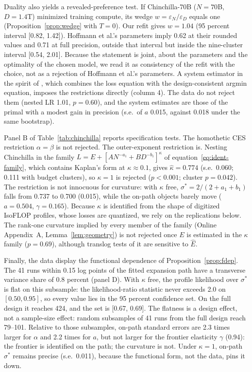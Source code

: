 Duality also yields a revealed-preference test. If Chinchilla-70B ($N=70$B, $D=1.4$T) minimized training compute,
its wedge $w=\varepsilon_N/\varepsilon_D$ equals one (Proposition~\ref{prop:wedge} with $T=0$). Our refit gives
$w=1.04$ (95 percent interval [0.82, 1.42]). Hoffmann et al.'s parameters imply 0.62 at their rounded values and 0.71
at full precision, outside that interval but inside the nine-cluster interval [0.54, 2.01]. Because the statement is joint,
about the parameters and the optimality of the chosen model, we read it as consistency of the refit with the choice,
not as a rejection of Hoffmann et al.'s parameters. A system estimator in the spirit of
\citet{leonledesma2010identifying}, which combines the loss equation with the design-consistent argmin equation,
imposes the restrictions directly (column 4). The data do not reject them (nested LR 1.01, $p=0.60$), and the system
estimates are those of the primal with a modest gain in precision (s.e.\ of $a$ 0.015, against 0.018 under the same
bootstrap).

Panel B of Table~\ref{tab:chinchilla} reports specification tests. The homothetic CES restriction $\alpha=\beta$ is not rejected. The outer-exponent
restriction is. Nesting Chinchilla in the family $L=E+[AN^{-a_1}+BD^{-b_1}]^{\kappa}$ of
equation~\eqref{eq:ident-family}, which contains Kaplan's form at $\kappa\approx0.1$, gives $\hat\kappa=0.774$ (s.e.\
0.060; 0.111 with budget clusters), so $\kappa=1$ is rejected ($p<0.001$; cluster $p=0.042$). The restriction is not
innocuous for curvature: with $\kappa$ free, $\sigma^*=2/(2+a_1+b_1)$ falls from 0.737 to 0.700 (0.015), while the
on-path objects barely move ($a=0.504$, $\gamma=0.165$). Because $\kappa$ is identified from the shape of digitized
IsoFLOP profiles, whose losses are quantized, we rely on the replications below. The rank-one curvature implied by
every member of the family (Online Appendix~A, Lemma~\ref{lem:geometry}) is not rejected once $E$ is estimated in the $\kappa$ family
($p=0.69$), although translog tests of it are sensitive to $\hat E$.

Finally, the data display the functional dependence of Proposition~\ref{prop:fdep}. The 41 runs within 0.15 log
points of the fitted expansion path have a transverse variance share of 0.8 percent (panel D). With $\kappa$ free, the
profile likelihood over $\sigma^*$ is flat on this subsample: the likelihood-ratio statistic never exceeds 2.0 on
$[0.50,0.95]$, so every value lies in the 95 percent confidence set. On the full design it reaches 424, and the set is
[0.67, 0.69]. The flatness is a design effect, not a sample-size effect: random subsamples of 41 runs from the full
design reach 79--101. Relative to those subsamples, on-path standard errors are 2.3 times larger for $\alpha$ and 2.2
times for $a$, but not larger for the frontier elasticity $\gamma$ (0.94): the frontier is identified on the path;
the curvature is not. Under $\kappa=1$, on-path $\sigma^*$ remains precise (s.e.\ 0.011), because the functional form,
not the data, pins it down.

